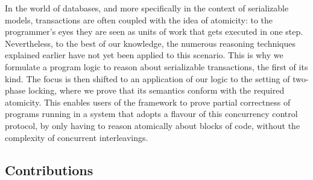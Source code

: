 In the world of databases, and more specifically in the context of serializable models, transactions are often coupled with the idea of atomicity: to the programmer's eyes they are seen as units of work that gets executed in one step. Nevertheless, to the best of our knowledge, the numerous reasoning techniques explained earlier have not yet been applied to this scenario. This is why we formulate a program logic to reason about serializable transactions, the first of its kind. The focus is then shifted to an application of our logic to the setting of two-phase locking, where we prove that its semantics conform with the required atomicity. This enables users of the framework to prove partial correctness of  programs running in a system that adopts a flavour of this concurrency control protocol, by only having to reason atomically about blocks of code, without the complexity of concurrent interleavings. 

\subsection{Contributions}

